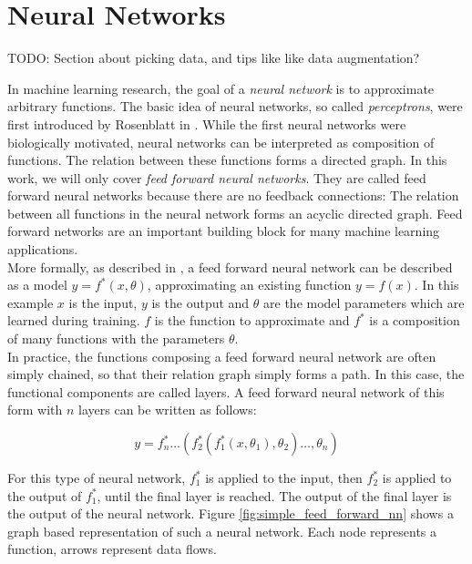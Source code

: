 
\section{Neural Networks}
\label{sec:neural_networks}


TODO: Section about picking data, and tips like like data augmentation? 

In machine learning research, the goal of a \textit{neural network} is to approximate arbitrary functions. The basic idea of neural networks, so called \textit{perceptrons}, were first introduced by Rosenblatt in \cite{rosenblatt1958perceptron}. While the first neural networks were biologically motivated, neural networks can be interpreted as composition of functions. The relation between these functions forms a directed graph. In this work, we will only cover \textit{feed forward neural networks}. They are called feed forward neural networks because there are no feedback connections: The relation between all functions in the neural network forms an acyclic directed graph. Feed forward networks are an important building block for many machine learning applications. 
\\
More formally, as described in \cite{Goodfellow-et-al-2016}, a feed forward neural network can be described as a model $y = f^*(x, \theta)$, approximating an existing function $y = f(x)$. In this example $x$ is the input, $y$ is the output and $\theta$ are the model parameters which are learned during training. $f$ is the function to approximate and $f^*$ is a composition of many functions with the parameters $\theta$. 
\\
In practice, the functions composing a feed forward neural network are often simply chained, so that their relation graph simply forms a path. In this case, the functional components are called layers. A feed forward neural network of this form with $n$ layers can be written as follows:

\[
y = f^*_n \dots (f^*_2(f^*_1(x, \theta_1), \theta_2) \dots, \theta_n)
\]

For this type of neural network, $f^*_1$ is applied to the input, then $f^*_2$ is applied to the output of $f^*_1$, until the final layer is reached. The output of the final layer is the output of the neural network. Figure \ref{fig:simple_feed_forward_nn} shows a graph based representation of such a neural network. Each node represents a function, arrows represent data flows. 

